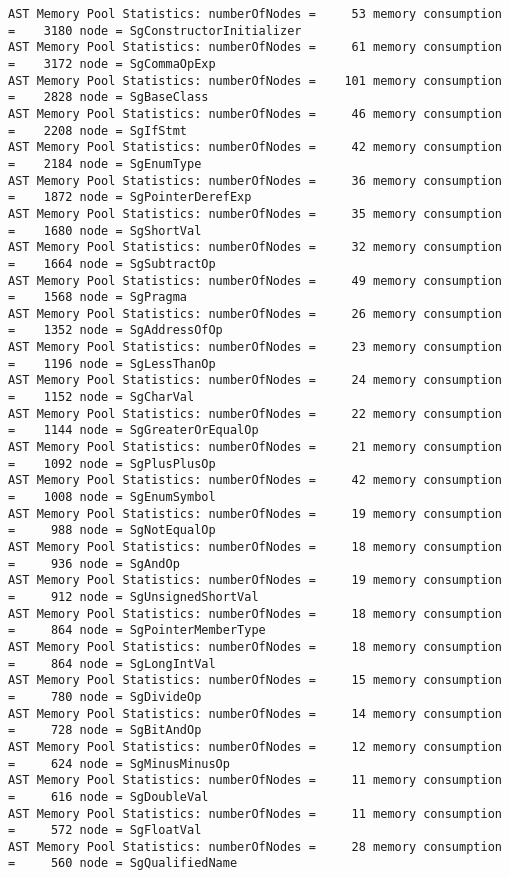 {{\begin{verbatim}
AST Memory Pool Statistics: numberOfNodes =     53 memory consumption =    3180 node = SgConstructorInitializer
AST Memory Pool Statistics: numberOfNodes =     61 memory consumption =    3172 node = SgCommaOpExp
AST Memory Pool Statistics: numberOfNodes =    101 memory consumption =    2828 node = SgBaseClass
AST Memory Pool Statistics: numberOfNodes =     46 memory consumption =    2208 node = SgIfStmt
AST Memory Pool Statistics: numberOfNodes =     42 memory consumption =    2184 node = SgEnumType
AST Memory Pool Statistics: numberOfNodes =     36 memory consumption =    1872 node = SgPointerDerefExp
AST Memory Pool Statistics: numberOfNodes =     35 memory consumption =    1680 node = SgShortVal
AST Memory Pool Statistics: numberOfNodes =     32 memory consumption =    1664 node = SgSubtractOp
AST Memory Pool Statistics: numberOfNodes =     49 memory consumption =    1568 node = SgPragma
AST Memory Pool Statistics: numberOfNodes =     26 memory consumption =    1352 node = SgAddressOfOp
AST Memory Pool Statistics: numberOfNodes =     23 memory consumption =    1196 node = SgLessThanOp
AST Memory Pool Statistics: numberOfNodes =     24 memory consumption =    1152 node = SgCharVal
AST Memory Pool Statistics: numberOfNodes =     22 memory consumption =    1144 node = SgGreaterOrEqualOp
AST Memory Pool Statistics: numberOfNodes =     21 memory consumption =    1092 node = SgPlusPlusOp
AST Memory Pool Statistics: numberOfNodes =     42 memory consumption =    1008 node = SgEnumSymbol
AST Memory Pool Statistics: numberOfNodes =     19 memory consumption =     988 node = SgNotEqualOp
AST Memory Pool Statistics: numberOfNodes =     18 memory consumption =     936 node = SgAndOp
AST Memory Pool Statistics: numberOfNodes =     19 memory consumption =     912 node = SgUnsignedShortVal
AST Memory Pool Statistics: numberOfNodes =     18 memory consumption =     864 node = SgPointerMemberType
AST Memory Pool Statistics: numberOfNodes =     18 memory consumption =     864 node = SgLongIntVal
AST Memory Pool Statistics: numberOfNodes =     15 memory consumption =     780 node = SgDivideOp
AST Memory Pool Statistics: numberOfNodes =     14 memory consumption =     728 node = SgBitAndOp
AST Memory Pool Statistics: numberOfNodes =     12 memory consumption =     624 node = SgMinusMinusOp
AST Memory Pool Statistics: numberOfNodes =     11 memory consumption =     616 node = SgDoubleVal
AST Memory Pool Statistics: numberOfNodes =     11 memory consumption =     572 node = SgFloatVal
AST Memory Pool Statistics: numberOfNodes =     28 memory consumption =     560 node = SgQualifiedName

\end{verbatim}}}
